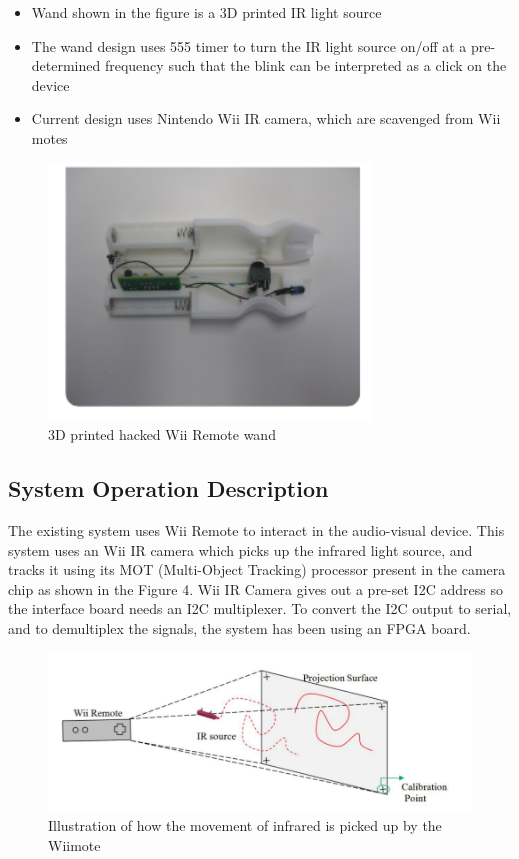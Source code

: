 \documentclass[12pt, a4paper]{article}
\begin{document}
\begin{itemize}
\item Wand shown in the figure is a 3D printed IR light source
\item The wand design uses 555 timer to turn the IR light source on/off at a pre-determined frequency such that the blink can be interpreted as a click on the device
\item Current design uses Nintendo Wii IR camera, which are scavenged from Wii motes
\end{itemize}
\begin{figure}[htp]
\centering
\includegraphics[scale=0.4]{wand1.png}
\caption{3D printed hacked Wii Remote wand}
\label{}
\end{figure}

\newpage
\subsection{System Operation Description}
The existing system uses Wii Remote to interact in the audio-visual device. This system uses an Wii IR camera which picks up the infrared light source, and tracks it using its MOT (Multi-Object Tracking) processor present in the camera chip as shown in the Figure 4. Wii IR Camera gives out a pre-set I2C address so the interface board needs an I2C multiplexer. To convert the I2C output to serial, and to demultiplex the signals, the system has been using an FPGA board. 

\begin{figure}[htp]
\centering
\includegraphics[scale=0.35]{wiiiii.png}
\caption{Illustration of how the movement of infrared is picked up by the Wiimote}
\label{}
\end{figure}
\end{document}
